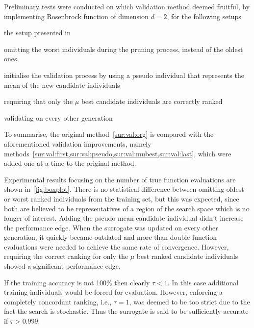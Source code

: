 Preliminary tests were conducted on which validation method deemed fruitful, by 
implementing  Rosenbrock function of dimension $d=2$, for the following setups 
\begin{enumerate*}[label=Method \emph{\roman*})]
    \item \label{sur:val:org} the setup presented in \cite{Ru06:PPSN}
    \item \label{sur:val:first} omitting the worst individuals during the 
    pruning process, instead of the oldest ones
    \item \label{sur:val:pseudo} initialise the validation process by using a 
    pseudo individual that represents the mean of the new candidate individuals
    \item \label{sur:val:mubest} requiring that only the $\mu$ best candidate 
    individuals are correctly ranked
    \item \label{sur:val:last} validating on every other generation
\end{enumerate*}
To summarise, the original method~\cref{sur:val:org} is compared with the aforementioned validation improvements, namely methods~\cref{sur:val:first,sur:val:pseudo,sur:val:mubest,sur:val:last}, which were added one at a time to the original method. 


Experimental results focusing on the number of true function evaluations are shown in~\cref{fig:boxplot}. There is no statistical difference between omitting oldest or worst ranked individuals  from the training set, but this was expected, since both are believed to be representatives of a region of the search space which is no longer of interest. Adding the pseudo mean candidate individual didn't increase the performance edge. When the surrogate was updated on every other generation, it quickly became outdated and more than double function evaluations were needed to achieve the same rate of convergence. 
However, requiring the correct ranking for only the $\mu$ best ranked candidate individuals showed a significant performance edge. 

If the training accuracy is not 100\% then clearly $\tau < 1$. In this case additional training individuals  would be forced for evaluation. However, enforcing a completely concordant ranking, i.e.,  $\tau=1$, was deemed to be too strict due to the fact the search is stochastic. Thus the surrogate is said to be sufficiently accurate if $\tau>0.999$. 

